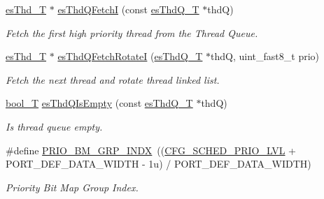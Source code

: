 \begin{DoxyCompactItemize}
\hyperlink{group__kern__intf_ga62e3a3ca0a4597a19c43cb8868810d82}{es\-Thd\-\_\-\-T} $\ast$ \hyperlink{group__kern__intf_ga1670c123f31c346b24ec9d2b7ae35f88}{es\-Thd\-Q\-Fetch\-I} (const \hyperlink{group__kern__intf_ga7a1a060699e83a01512ebb5540019556}{es\-Thd\-Q\-\_\-\-T} $\ast$thd\-Q)
\begin{DoxyCompactList}\small\item\em Fetch the first high priority thread from the Thread Queue. \end{DoxyCompactList}\item 
\hyperlink{group__kern__intf_ga62e3a3ca0a4597a19c43cb8868810d82}{es\-Thd\-\_\-\-T} $\ast$ \hyperlink{group__kern__intf_gae365b14292f1496a90d876baec84fb4e}{es\-Thd\-Q\-Fetch\-Rotate\-I} (\hyperlink{group__kern__intf_ga7a1a060699e83a01512ebb5540019556}{es\-Thd\-Q\-\_\-\-T} $\ast$thd\-Q, uint\-\_\-fast8\-\_\-t prio)
\begin{DoxyCompactList}\small\item\em Fetch the next thread and rotate thread linked list. \end{DoxyCompactList}\item 
\hyperlink{group__template__compiler_ga74fbee312f9185efb602f89d21b53404}{bool\-\_\-\-T} \hyperlink{group__kern__intf_gacf2687b82ce64e2154d97fd3b69a4ab5}{es\-Thd\-Q\-Is\-Empty} (const \hyperlink{group__kern__intf_ga7a1a060699e83a01512ebb5540019556}{es\-Thd\-Q\-\_\-\-T} $\ast$thd\-Q)
\begin{DoxyCompactList}\small\item\em Is thread queue empty. \end{DoxyCompactList}\item 
\#define \hyperlink{group__kern__intf_ga28fb55234bec595dbeb2c264ac084cc1}{P\-R\-I\-O\-\_\-\-B\-M\-\_\-\-G\-R\-P\-\_\-\-I\-N\-D\-X}~((\hyperlink{group__template__kern__cfg_ga56bd89fe76f7fe22f3d8805bc3c68892}{C\-F\-G\-\_\-\-S\-C\-H\-E\-D\-\_\-\-P\-R\-I\-O\-\_\-\-L\-V\-L} + P\-O\-R\-T\-\_\-\-D\-E\-F\-\_\-\-D\-A\-T\-A\-\_\-\-W\-I\-D\-T\-H -\/ 1u) / P\-O\-R\-T\-\_\-\-D\-E\-F\-\_\-\-D\-A\-T\-A\-\_\-\-W\-I\-D\-T\-H)
\begin{DoxyCompactList}\small\item\em Priority Bit Map Group Index. \end{DoxyCompactList}\end{DoxyCompactItemize}
